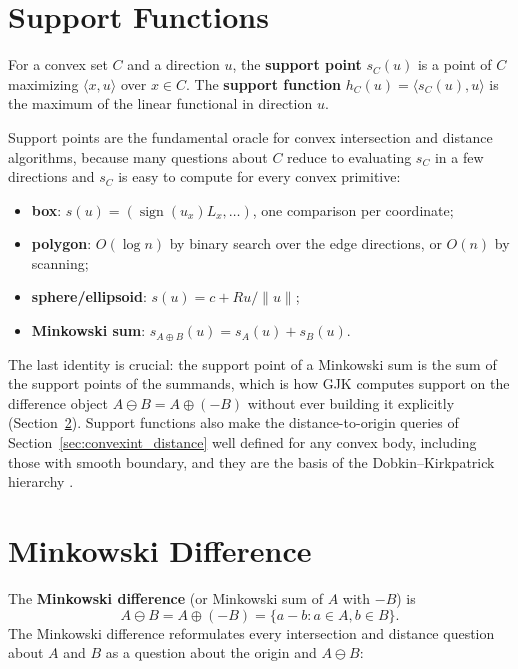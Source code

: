 \section{Support Functions}
\label{sec:convexint_support_functions}

\begin{definition}\label{def:convexint_support}
  For a convex set $C$ and a direction $u$, the \textbf{support point}
  $s_C(u)$ is a point of $C$ maximizing $\langle x, u\rangle$ over $x \in
  C$. The \textbf{support function} $h_C(u) = \langle s_C(u), u\rangle$ is
  the maximum of the linear functional in direction $u$.
\end{definition}

Support points are the fundamental oracle for convex intersection and
distance algorithms, because many questions about $C$ reduce to evaluating
$s_C$ in a few directions and $s_C$ is easy to compute for every convex
primitive:
\begin{itemize}
  \item \textbf{box}: $s(u) = (\operatorname{sign}(u_x)L_x, \dots)$, one
    comparison per coordinate;
  \item \textbf{polygon}: $O(\log n)$ by binary search over the edge
    directions, or $O(n)$ by scanning;
  \item \textbf{sphere/ellipsoid}: $s(u) = c + R u/\|u\|$;
  \item \textbf{Minkowski sum}: $s_{A \oplus B}(u) = s_A(u) + s_B(u)$.
\end{itemize}
The last identity is crucial: the support point of a Minkowski sum is the
sum of the support points of the summands, which is how GJK computes
support on the difference object $A \ominus B = A \oplus (-B)$ without ever
building it explicitly (Section~\ref{sec:convexint_minkowski_difference}).
Support functions also make the distance-to-origin queries of
Section~\ref{sec:convexint_distance} well defined for any convex body,
including those with smooth boundary, and they are the basis of the
Dobkin--Kirkpatrick hierarchy \cite{dobkin1983}.


\section{Minkowski Difference}
\label{sec:convexint_minkowski_difference}

The \textbf{Minkowski difference} (or Minkowski sum of $A$ with $-B$) is
\[
  A \ominus B = A \oplus (-B) = \{ a - b : a \in A, b \in B\}.
\]
The Minkowski difference reformulates every intersection and distance
question about $A$ and $B$ as a question about the origin and
$A \ominus B$:

